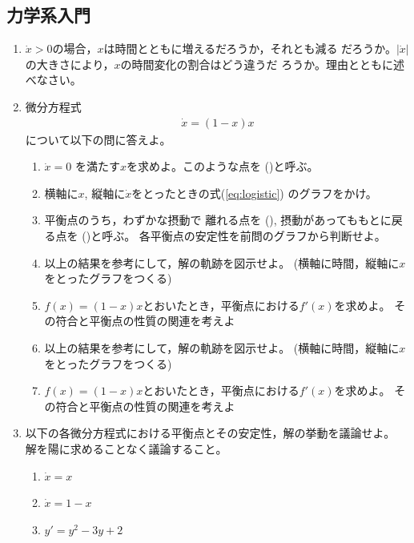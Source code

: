 \documentclass[twocolumn,11pt]{jarticle}
\begin{document}
\subsection{力学系入門}

\begin{enumerate}
\item $\dot{x}>0$の場合，$x$は時間とともに増えるだろうか，それとも減る
  だろうか。$|\dot{x}|$の大きさにより，$x$の時間変化の割合はどう違うだ
  ろうか。理由とともに述べなさい。
\item 微分方程式
  \begin{align}
    \label{eq:logistic}
    \dot{x}=(1-x)x
  \end{align}
  について以下の問に答えよ。
  \begin{enumerate}
  \item $\dot{x}=0$ を満たす$x$を求めよ。このような点を
    ()と呼ぶ。
  \item 横軸に$x$, 縦軸に$\dot{x}$をとったときの式(\ref{eq:logistic})
    のグラフをかけ。
\item 
  平衡点のうち，わずかな摂動で
  離れる点を
  (), 
  摂動があってももとに戻る点を
  ()と呼ぶ。
  各平衡点の安定性を前問のグラフから判断せよ。
\item 以上の結果を参考にして，解の軌跡を図示せよ。
  (横軸に時間，縦軸に$x$をとったグラフをつくる) 
\item $f(x)=(1-x)x$とおいたとき，平衡点における$f'(x)$を求めよ。
  その符合と平衡点の性質の関連を考えよ
  \item 以上の結果を参考にして，解の軌跡を図示せよ。
    (横軸に時間，縦軸に$x$をとったグラフをつくる) 
  \item $f(x)=(1-x)x$とおいたとき，平衡点における$f'(x)$を求めよ。
    その符合と平衡点の性質の関連を考えよ
  \end{enumerate}
\item 以下の各微分方程式における平衡点とその安定性，解の挙動を議論せよ。
解を陽に求めることなく議論すること。
  \begin{enumerate}
  \item $\dot{x}=x$
  \item $\dot{x}=1-x$
  \item $y'=y^2-3y+2$
  \end{enumerate}

\end{enumerate}
\end{document}
